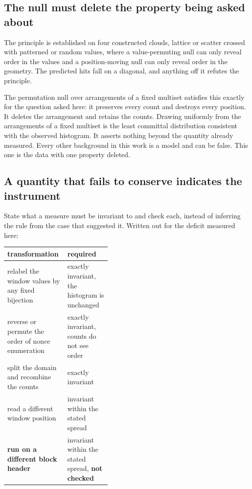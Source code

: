 \subsection{The null must delete the property being asked about}

The principle is established on four constructed clouds, lattice or scatter crossed with patterned or random values, where a value-permuting null can only reveal order in the values and a position-moving null can only reveal order in the geometry. The predicted hits fall on a diagonal, and anything off it refutes the principle.

The permutation null over arrangements of a fixed multiset satisfies this exactly for the question asked here: it preserves every count and destroys every position. It deletes the arrangement and retains the counts. Drawing uniformly from the arrangements of a fixed multiset is the least committal distribution consistent with the observed histogram. It asserts nothing beyond the quantity already measured. Every other background in this work is a model and can be false. This one is the data with one property deleted.

\subsection{A quantity that fails to conserve indicates the instrument}

State what a measure must be invariant to and check each, instead of inferring the rule from the case that suggested it. Written out for the deficit measured here:

\begin{center}
\begin{tabular}{@{}lp{0.42\linewidth}@{}}
\toprule
transformation & required \\
\midrule
relabel the window values by any fixed bijection & exactly invariant, the histogram is unchanged \\
reverse or permute the order of nonce enumeration & exactly invariant, counts do not see order \\
split the domain and recombine the counts & exactly invariant \\
read a different window position & invariant within the stated spread \\
\textbf{run on a different block header} & invariant within the stated spread, \textbf{not checked} \\
\bottomrule
\end{tabular}
\end{center}

